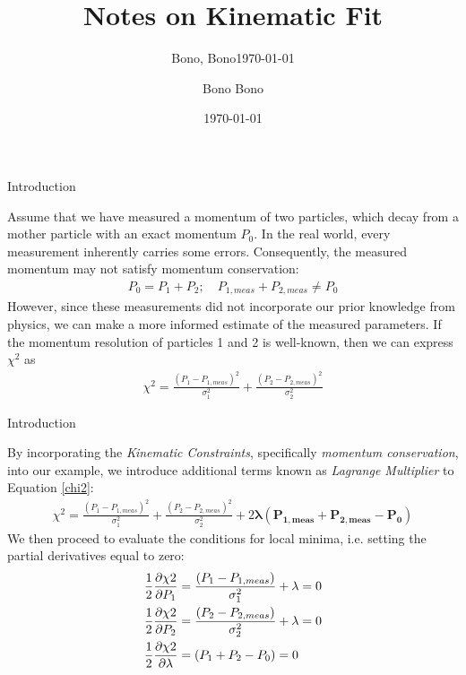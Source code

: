 \documentclass[
	xcolor=dvipsnames,
	10pt, 
	]{beamer}
\title[]{Notes on Kinematic Fit}
\author[Author]{Bono Bono}
\institute{Bono University}
\date{\today}
\subtitle{Bono, Bono\footnotemark[1]\newline\today}
\begin{document}
\begin{frame}[t,plain] %
       \titlepage
\end{frame}
\begin{frame}{Introduction}
	\begin{block}{}
	Assume that we have measured a momentum of two particles, which decay from a mother particle with an exact momentum $P_0$. In the real world, every measurement inherently carries some errors. Consequently, the measured momentum may not satisfy momentum conservation:
	\begin{align}
	P_{0}=P_{1}+P_{2};\quad P_{1,meas}+P_{2,meas}\neq P_{0} 
	\end{align}
	However, since these measurements did not incorporate our prior knowledge from physics, we can make a more informed estimate of the measured parameters. If the momentum resolution of particles 1 and 2 is well-known, then we can express $\chi^2$ as
	\begin{align}
		\chi^2= \frac{(P_{1}-P_{1,meas})^2}{\sigma_1^2}+\frac{(P_{2}-P_{2,meas})^2}{\sigma_2^2}\label{chi2}
	\end{align}
	\end{block}
\end{frame}
\begin{frame}{Introduction}
	\begin{block}{}
		By incorporating the \textit{Kinematic Constraints}, specifically \textit{momentum conservation}, into our example, we introduce additional terms known as \textit{Lagrange Multiplier} to Equation \eqref{chi2}:
		\vspace{-5 mm}
		\begin{align}
			\chi^2= \frac{(P_{1}-P_{1,meas})^2}{\sigma_1^2}+\frac{(P_{2}-P_{2,meas})^2}{\sigma_2^2}\label{chi2} + 2\mathbf{\lambda(P_{1,meas}+P_{2,meas}-P_0)}
		\end{align} 
		We then proceed to evaluate the conditions for local minima, i.e. setting the partial derivatives equal to zero:
		\begin{align}
			\frac{1}{2}\frac{\partial \chi2}{\partial P_{1}}&=\frac{(P_{1}-P_{1,meas})}{\sigma_1^2}+\lambda=0\label{dxd1}\\
			\frac{1}{2}\frac{\partial \chi2}{\partial P_{2}}&=\frac{(P_{2}-P_{2,meas})}{\sigma_2^2}+\lambda=0\label{dxd2}
			\\
			\frac{1}{2}\frac{\partial \chi2}{\partial \lambda}&=(P_{1}+P_{2}-P_0)=0\label{dxdl}
		\end{align}
	\end{block}
\end{frame}
\end{document}
